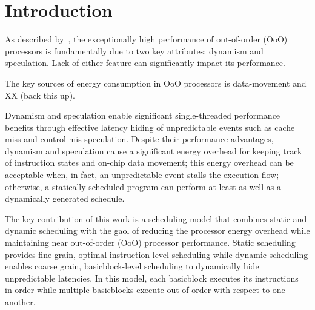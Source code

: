 \section{Introduction} 
\label{sec:intro}

As described by~\cite{}, the exceptionally high
performance of out-of-order (OoO) processors is fundamentally due to two key
attributes: dynamism and speculation.  Lack of either feature can significantly
impact its performance. 

The key sources of energy consumption in OoO processors is data-movement and XX
(back this up).

Dynamism and speculation enable significant single-threaded performance benefits
through effective latency hiding of unpredictable events such as cache miss and
control mis-speculation.  Despite their performance advantages, dynamism and
speculation cause a significant energy overhead for keeping track of instruction
states and on-chip data movement; this energy overhead can be acceptable when,
in fact, an unpredictable event stalls the execution flow; otherwise, a
statically scheduled program can perform at least as well as a
dynamically generated schedule.

The key contribution of this work is a scheduling model that combines static and
dynamic scheduling with the gaol of reducing the processor energy overhead while
maintaining near out-of-order (OoO) processor performance. Static scheduling provides
fine-grain, optimal instruction-level scheduling while dynamic scheduling
enables coarse grain, basicblock-level scheduling to dynamically hide
unpredictable latencies.  In this model, each basicblock executes its
instructions in-order while multiple basicblocks execute out of order with
respect to one another.
